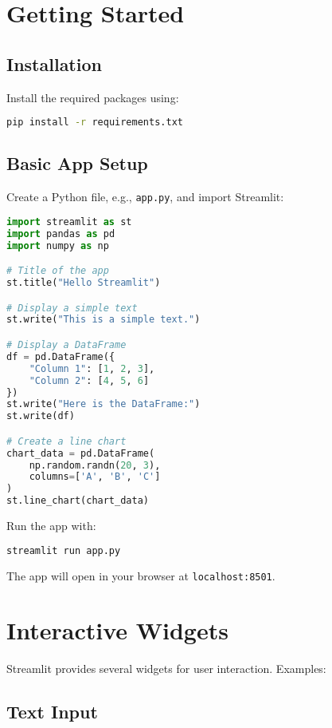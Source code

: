 \section{Getting Started}

\subsection{Installation}

Install the required packages using:

\begin{lstlisting}[language=bash]
pip install -r requirements.txt
\end{lstlisting}

\subsection{Basic App Setup}

Create a Python file, e.g., \texttt{app.py}, and import Streamlit:

\begin{lstlisting}[language=Python]
import streamlit as st
import pandas as pd
import numpy as np

# Title of the app
st.title("Hello Streamlit")

# Display a simple text
st.write("This is a simple text.")

# Display a DataFrame
df = pd.DataFrame({
    "Column 1": [1, 2, 3],
    "Column 2": [4, 5, 6]
})
st.write("Here is the DataFrame:")
st.write(df)

# Create a line chart
chart_data = pd.DataFrame(
    np.random.randn(20, 3),
    columns=['A', 'B', 'C']
)
st.line_chart(chart_data)
\end{lstlisting}

Run the app with:

\begin{lstlisting}[language=bash]
streamlit run app.py
\end{lstlisting}

The app will open in your browser at \texttt{localhost:8501}.

\section{Interactive Widgets}

Streamlit provides several widgets for user interaction. Examples:

\subsection{Text Input}

